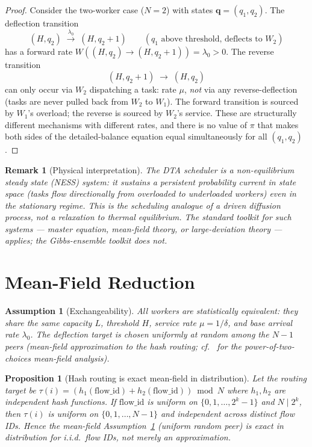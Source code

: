 \documentclass[11pt,a4paper]{article}
\newtheorem{proposition}[theorem]{Proposition}
\newtheorem{assumption}{Assumption}[section]
\newtheorem{remark}{Remark}[section]
\begin{document}
\begin{proof}
Consider the two-worker case ($N=2$) with states
$\bm{q} = (q_1, q_2)$.  The deflection transition
\[
  (H, q_2) \;\xrightarrow{\lambda_0}\; (H, q_2 + 1)
  \qquad (q_1 \text{ above threshold, deflects to } W_2)
\]
has a forward rate $W((H, q_2) \to (H, q_2+1)) = \lambda_0 > 0$.
The reverse transition
\[
  (H, q_2+1) \;\to\; (H, q_2)
\]
can only occur via $W_2$ dispatching a task: rate $\mu$, \emph{not}
via any reverse-deflection (tasks are never pulled back from $W_2$
to $W_1$).  The forward transition is sourced by $W_1$'s overload;
the reverse is sourced by $W_2$'s service.  These are
structurally different mechanisms with different rates, and there
is no value of $\pi$ that makes both sides of the detailed-balance
equation equal simultaneously for all $(q_1, q_2)$.
\end{proof}

\begin{remark}[Physical interpretation]
The DTA scheduler is a \emph{non-equilibrium steady state (NESS)}
system: it sustains a persistent probability current in state space
(tasks flow directionally from overloaded to underloaded workers)
even in the stationary regime.  This is the scheduling analogue of
a driven diffusion process, not a relaxation to thermal equilibrium.
The standard toolkit for such systems --- master equation,
mean-field theory, or large-deviation theory --- applies; the
Gibbs-ensemble toolkit does not.
\end{remark}

\section{Mean-Field Reduction}

\begin{assumption}[Exchangeability]
\label{ass:exch}
All workers are statistically equivalent: they share the same
capacity $L$, threshold $H$, service rate $\mu = 1/\delta$, and
base arrival rate $\lambda_0$.  The deflection target is chosen
uniformly at random among the $N-1$ peers (mean-field
approximation to the hash routing;
cf.~\cite{mitzenmacher2001,vvedenskaya1996} for the power-of-two-choices mean-field analysis).
\end{assumption}

\begin{proposition}[Hash routing is exact mean-field in distribution]
\label{prop:hash_mf}
Let the routing target be $\tau(i) = (h_1(\mathrm{flow\_id}) + h_2(\mathrm{flow\_id})) \bmod N$
where $h_1, h_2$ are independent hash functions.
If $\mathrm{flow\_id}$ is uniform on $\{0, 1, \ldots, 2^k - 1\}$ and $N \mid 2^k$,
then $\tau(i)$ is uniform on $\{0, 1, \ldots, N-1\}$ and independent across
distinct flow IDs.
Hence the mean-field Assumption~\ref{ass:exch} (uniform random peer) is
\emph{exact in distribution} for i.i.d.\ flow IDs, not merely an approximation.
\end{proposition}
\end{document}
